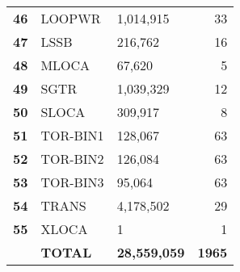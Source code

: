 \begin{longtable}{@{}rllr@{}}
\textbf{46} & LOOPWR           & 1,014,915 & 33 \\
\textbf{47} & LSSB             & 216,762   & 16 \\
\textbf{48} & MLOCA            & 67,620    & 5  \\
\textbf{49} & SGTR             & 1,039,329 & 12 \\
\textbf{50} & SLOCA            & 309,917   & 8  \\
\textbf{51} & TOR-BIN1         & 128,067   & 63 \\
\textbf{52} & TOR-BIN2         & 126,084   & 63 \\
\textbf{53} & TOR-BIN3         & 95,064    & 63 \\
\textbf{54} & TRANS            & 4,178,502 & 29 \\
\textbf{55} & XLOCA            & 1         & 1  \\
\textbf{}                       & \textbf{TOTAL}       & \multicolumn{1}{l}{\textbf{28,559,059}} & \textbf{1965}                          \\* \bottomrule
\end{longtable}